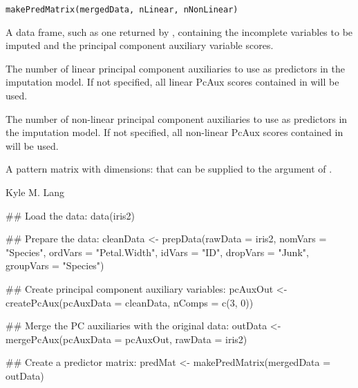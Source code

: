 \documentclass[letterpaper]{book}
\begin{document}
%
\begin{Usage}
\begin{verbatim}
makePredMatrix(mergedData, nLinear, nNonLinear)
\end{verbatim}
\end{Usage}
%
\begin{Arguments}
\begin{ldescription}
\item[\code{mergedData}] 
A data frame, such as one returned by ,
containing the incomplete variables to be imputed and the principal
component auxiliary variable scores.

\item[\code{nLinear}] 
The number of linear principal component auxiliaries to use as
predictors in the imputation model. If not specified, all linear PcAux
scores contained in  will be used.

\item[\code{nNonLinear}] 
The number of non-linear principal component auxiliaries to use as
predictors in the imputation model. If not specified, all non-linear
PcAux scores contained in  will be used.

\end{ldescription}
\end{Arguments}
%
\begin{Value}
A pattern matrix with dimensions:  that can be supplied to the
 argument of .
\end{Value}
%
\begin{Author}\relax
Kyle M. Lang
\end{Author}
%
\begin{SeeAlso}\relax
{}
\end{SeeAlso}
%
\begin{Examples}
\begin{ExampleCode}
## Load the data:
data(iris2)

## Prepare the data:
cleanData <- prepData(rawData   = iris2,
                      nomVars   = "Species",
                      ordVars   = "Petal.Width",
                      idVars    = "ID",
                      dropVars  = "Junk",
                      groupVars = "Species")

## Create principal component auxiliary variables:
pcAuxOut <- createPcAux(pcAuxData = cleanData, nComps = c(3, 0))

## Merge the PC auxiliaries with the original data:
outData <- mergePcAux(pcAuxData = pcAuxOut, rawData = iris2)

## Create a predictor matrix:
predMat <- makePredMatrix(mergedData = outData)
\end{ExampleCode}
\end{Examples}
\end{document}
